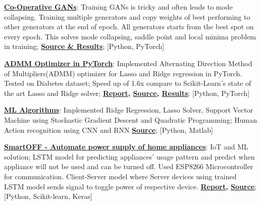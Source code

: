 \documentclass[a4paper, 10.5pt]{article}
\newcommand{\resumeItem}[2]{
  \item\small{
    \textbf{#1}{: #2 \vspace{-2pt}}
  }
}
\newcommand{\resumeSubItem}[2]{\resumeItem{#1}{#2}\vspace{-4pt}}
\begin{document}
    \resumeSubItem{\href{https://github.com/bhushan23/GAN/tree/master/Co-Operative-GAN}{Co-Operative GANs}}{Training GANs is tricky and often leads to mode collapsing. Training multiple generators and copy weights of best performing to other generators at the end of epoch. All generators starts from the best spot on every epoch. This solves mode collapsing, saddle point and local minima problem in training;\textbf{ \href{https://github.com/bhushan23/GAN/tree/master/Co-Operative-GAN}{Source \& Results}}; [Python, PyTorch]}
    \resumeSubItem{\href{https://github.com/bhushan23/pytorch/blob/1303c014dc3580654173c43fc6cf3409e4ef0438/torch/optim/admm.py}{ADMM Optimizer in PyTorch}}{Implemented Alternating Direction Method of Multipliers(ADMM) optimizer for Lasso and Ridge regression in PyTorch. Tested on Diabetes dataset; Speed up of 1.6x compare to Scikit-Learn's state of the art Lasso and Ridge solver; \textbf{\href{https://github.com/bhushan23/ADMM/blob/master/REPORT_ADMM_IN_PYTORCH.pdf}{Report}, \href{https://github.com/bhushan23/pytorch/blob/1303c014dc3580654173c43fc6cf3409e4ef0438/torch/optim/admm.py}{Source},  \href{https://github.com/bhushan23/ADMM}{Results}}; [Python, PyTorch]}
    \resumeSubItem{\href{https://github.com/bhushan23/SBU-ML-Assignment}{ML Algorithms}}{Implemented Ridge Regression, Lasso Solver, Support Vector Machine using Stochastic Gradient Descent and Quadratic Programming; Human Action recognition using CNN and RNN \textbf{\href{https://github.com/bhushan23/SBU-ML-Assignment}{Source}}; [Python, Matlab]}
    \resumeSubItem{\href{https://github.com/bhushan23/SmartOff}{SmartOFF - Automate power supply of home appliances}} {IoT and ML solution; LSTM model for predicting appliances' usage pattern and predict when appliance will not be used and can be turned off. Used ESP8266 Microcontroller for communication. Client-Server model where Server devices using trained LSTM model sends signal to toggle power of respective device. \textbf{\href{https://github.com/bhushan23/SmartOff/tree/master/Reports}{Report}, \href{https://github.com/bhushan23/SmartOff}{Source}}; [Python, Scikit-learn, Keras]}
\end{document}

